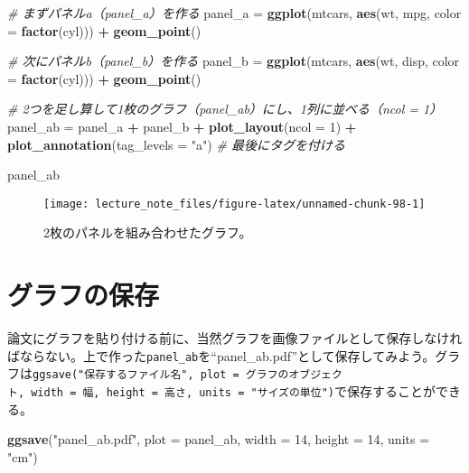 \documentclass[]{book}
\newenvironment{Shaded}{\begin{snugshade}}{\end{snugshade}}
\newcommand{\KeywordTok}[1]{\textcolor[rgb]{0.13,0.29,0.53}{\textbf{#1}}}
\newcommand{\DataTypeTok}[1]{\textcolor[rgb]{0.13,0.29,0.53}{#1}}
\newcommand{\DecValTok}[1]{\textcolor[rgb]{0.00,0.00,0.81}{#1}}
\newcommand{\StringTok}[1]{\textcolor[rgb]{0.31,0.60,0.02}{#1}}
\newcommand{\CommentTok}[1]{\textcolor[rgb]{0.56,0.35,0.01}{\textit{#1}}}
\newcommand{\OperatorTok}[1]{\textcolor[rgb]{0.81,0.36,0.00}{\textbf{#1}}}
\newcommand{\NormalTok}[1]{#1}
\begin{document}
\begin{Shaded}
\begin{Highlighting}[]
\CommentTok{# まずパネルa（panel_a）を作る}
\NormalTok{panel_a =}\StringTok{ }\KeywordTok{ggplot}\NormalTok{(mtcars, }\KeywordTok{aes}\NormalTok{(wt, mpg, }\DataTypeTok{color =} \KeywordTok{factor}\NormalTok{(cyl))) }\OperatorTok{+}
\StringTok{  }\KeywordTok{geom_point}\NormalTok{()}

\CommentTok{# 次にパネルb（panel_b）を作る}
\NormalTok{panel_b =}\StringTok{ }\KeywordTok{ggplot}\NormalTok{(mtcars, }\KeywordTok{aes}\NormalTok{(wt, disp, }\DataTypeTok{color =} \KeywordTok{factor}\NormalTok{(cyl))) }\OperatorTok{+}
\StringTok{  }\KeywordTok{geom_point}\NormalTok{()}

\CommentTok{# 2つを足し算して1枚のグラフ（panel_ab）にし、1列に並べる（ncol = 1）}
\NormalTok{panel_ab =}\StringTok{ }\NormalTok{panel_a }\OperatorTok{+}\StringTok{ }\NormalTok{panel_b }\OperatorTok{+}\StringTok{ }
\StringTok{  }\KeywordTok{plot_layout}\NormalTok{(}\DataTypeTok{ncol =} \DecValTok{1}\NormalTok{) }\OperatorTok{+}\StringTok{ }
\StringTok{  }\KeywordTok{plot_annotation}\NormalTok{(}\DataTypeTok{tag_levels =} \StringTok{"a"}\NormalTok{) }\CommentTok{# 最後にタグを付ける}

\NormalTok{panel_ab}
\end{Highlighting}
\end{Shaded}

\begin{figure}

{\centering \texttt{[image: lecture\_note\_files/figure-latex/unnamed-chunk-98-1]} 

}

\caption{2枚のパネルを組み合わせたグラフ。}\label{fig:unnamed-chunk-98}
\end{figure}

\section{グラフの保存}

論文にグラフを貼り付ける前に、当然グラフを画像ファイルとして保存しなければならない。上で作った\texttt{panel\_ab}を``panel\_ab.pdf''として保存してみよう。グラフは\texttt{ggsave("保存するファイル名",\ plot\ =\ グラフのオブジェクト,\ width\ =\ 幅,\ height\ =\ 高さ,\ units\ =\ "サイズの単位")}で保存することができる。

\begin{Shaded}
\begin{Highlighting}[]
\KeywordTok{ggsave}\NormalTok{(}\StringTok{"panel_ab.pdf"}\NormalTok{, }\DataTypeTok{plot =}\NormalTok{ panel_ab, }\DataTypeTok{width =} \DecValTok{14}\NormalTok{, }\DataTypeTok{height =} \DecValTok{14}\NormalTok{, }\DataTypeTok{units =} \StringTok{"cm"}\NormalTok{)}
\end{Highlighting}
\end{Shaded}
\end{document}
